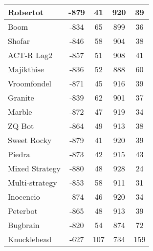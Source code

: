 \begin{table*}
\begin{tabular}{|l|c|c|c|c|}
Robertot & -879 & 41 & 920 & 39 \\ \hline 
Boom & -834 & 65 & 899 & 36 \\ \hline 
Shofar & -846 & 58 & 904 & 38 \\ \hline 
ACT-R Lag2 & -857 & 51 & 908 & 41 \\ \hline 
Majikthise & -836 & 52 & 888 & 60 \\ \hline 
Vroomfondel & -871 & 45 & 916 & 39 \\ \hline 
Granite & -839 & 62 & 901 & 37 \\ \hline 
Marble & -872 & 47 & 919 & 34 \\ \hline 
ZQ Bot & -864 & 49 & 913 & 38 \\ \hline 
Sweet Rocky & -879 & 41 & 920 & 39 \\ \hline 
Piedra & -873 & 42 & 915 & 43 \\ \hline 
Mixed Strategy & -880 & 48 & 928 & 24 \\ \hline 
Multi-strategy & -853 & 58 & 911 & 31 \\ \hline 
Inocencio & -874 & 46 & 920 & 34 \\ \hline 
Peterbot & -865 & 48 & 913 & 39 \\ \hline 
Bugbrain & -820 & 54 & 874 & 72 \\ \hline 
Knucklehead & -627 & 107 & 734 & 159 \\ \hline
        \end{tabular}
    \end{table*}